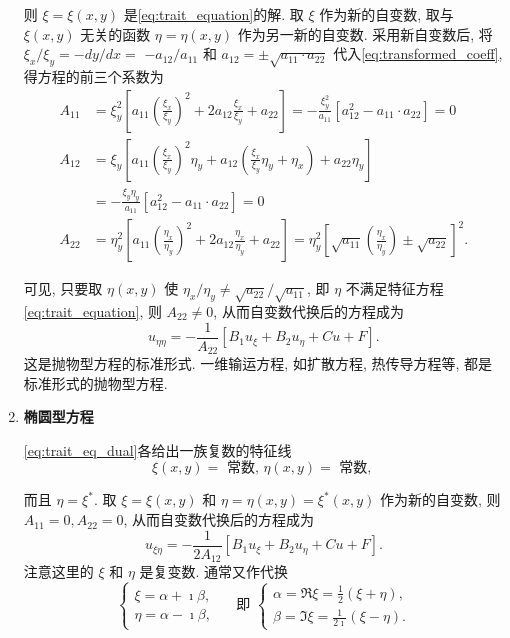 \begin{enumerate}
    则 $\xi=\xi(x, y)$ 是\eqref{eq:trait_equation}的解. 
    取 $\xi$ 作为新的自变数, 取与 $\xi(x, y)$ 无关的函数 $\eta=\eta(x, y)$ 作为另一新的自变数. 
    采用新自变数后, 将 $\xi_x / \xi_y=-d y / d x=$ $-a_{12} / a_{11}$ 和 
    $a_{12}= \pm \sqrt{a_{11} \cdot a_{22}}$ 代入\eqref{eq:transformed_coeff}, 得方程的前三个系数为
    $$
    \begin{aligned}
    A_{11} & =\xi_y^2\left[a_{11}\left(\frac{\xi_x}{\xi_y}\right)^2+2 a_{12} \frac{\xi_x}{\xi_y}+a_{22}\right]=-\frac{\xi_y^2}{a_{11}}\left[a_{12}^2-a_{11} \cdot a_{22}\right]=0 \\
    A_{12} & =\xi_y\left[a_{11}\left(\frac{\xi_x}{\xi_y}\right)^2 \eta_y+a_{12}\left(\frac{\xi_x}{\xi_y} \eta_y+\eta_x\right)+a_{22} \eta_y\right] \\
    & =-\frac{\xi_y \eta_y}{a_{11}}\left[a_{12}^2-a_{11} \cdot a_{22}\right]=0 \\
    A_{22} & =\eta_y^2\left[a_{11}\left(\frac{\eta_x}{\eta_y}\right)^2+2 a_{12} \frac{\eta_x}{\eta_y}+a_{22}\right]=\eta_y^2\left[\sqrt{a_{11}}\left(\frac{\eta_x}{\eta_y}\right) \pm \sqrt{a_{22}}\right]^2 .
    \end{aligned}
    $$

    可见, 只要取 $\eta(x, y)$ 使 $\eta_x / \eta_y \neq \sqrt{a_{22}} / \sqrt{a_{11}}$, 即 $\eta$ 不满足特征方程\eqref{eq:trait_equation}, 
    则 $A_{22} \neq 0$, 从而自变数代换后的方程成为
    $$
    u_{\eta \eta}=-\frac{1}{A_{22}}\left[B_1 u_{\xi}+B_2 u_\eta+C u+F\right] .
    $$
    这是抛物型方程的标准形式. 一维输运方程, 如扩散方程, 热传导方程等, 都是标准形式的抛物型方程.


\item \textbf{椭圆型方程}

\eqref{eq:trait_eq_dual}各给出一族复数的特征线
$$
\xi(x, y)=\text { 常数, } \eta(x, y)=\text { 常数, }
$$

而且 $\eta=\xi^*$. 取 $\xi=\xi(x, y)$ 和 $\eta=\eta(x, y)=\xi^*(x, y)$ 作为新的自变数, 
则 $A_{11}=0, A_{22}=0$, 从而自变数代换后的方程成为
\begin{equation}
    u_{\xi \eta}=-\frac{1}{2 A_{12}}\left[B_1 u_{\xi}+B_2 u_\eta+C u+F\right] .
    \label{eq:standard_elliptic_semi}
\end{equation}
注意这里的 $\xi$ 和 $\eta$ 是复变数. 通常又作代换
$$
\left\{\begin{array} { l } 
{ \xi = \alpha + \imath \beta , } \\
{ \eta = \alpha - \imath \beta , }
\end{array} \quad \text { 即 } \left\{\begin{array}{l}
\alpha=\Re \xi=\frac{1}{2}(\xi+\eta), \\
\beta=\Im \xi=\frac{1}{2 \imath}(\xi-\eta) .
\end{array}\right.\right.
$$


\end{enumerate}

